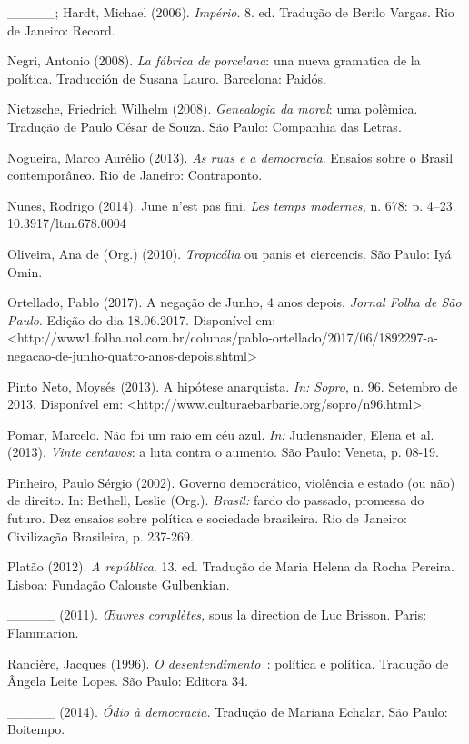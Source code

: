 \_\_\_\_\_; Hardt, Michael (2006). \emph{Império}. 8. ed. Tradução de
Berilo Vargas. Rio de Janeiro: Record.

Negri, Antonio (2008). \emph{La fábrica de porcelana}: una nueva
gramatica de la política. Traducción de Susana Lauro. Barcelona: Paidós.

Nietzsche, Friedrich Wilhelm (2008). \emph{Genealogia da moral}: uma
polêmica. Tradução de Paulo César de Souza. São Paulo: Companhia das
Letras.

Nogueira, Marco Aurélio (2013). \emph{As ruas e a democracia}. Ensaios
sobre o Brasil contemporâneo. Rio de Janeiro: Contraponto.

Nunes, Rodrigo (2014). June n'est pas fini. \emph{Les temps modernes,}
n. 678: p. 4--23. 10.3917/ltm.678.0004

Oliveira, Ana de (Org.) (2010). \emph{Tropicália }ou panis et
ciercencis. São Paulo: Iyá Omin.

Ortellado, Pablo (2017). A negação de Junho, 4 anos depois. \emph{Jornal
Folha de São Paulo}. Edição do dia 18.06.2017. Disponível em:
\textless{}http://www1.folha.uol.com.br/colunas/pablo-ortellado/2017/06/1892297-a-negacao-de-junho-quatro-anos-depois.shtml\textgreater{}

Pinto Neto, Moysés (2013). A hipótese anarquista. \emph{In: Sopro}, n.
96. Setembro de 2013. Disponível em:
\textless{}http://www.culturaebarbarie.org/sopro/n96.html\textgreater{}.

Pomar, Marcelo. Não foi um raio em céu azul. \emph{In: }Judensnaider,
Elena et al. (2013). \emph{Vinte centavos}: a luta contra o aumento. São
Paulo: Veneta, p. 08-19.

Pinheiro, Paulo Sérgio (2002). Governo democrático, violência e estado
(ou não) de direito. In: Bethell, Leslie (Org.). \emph{Brasil:} fardo do
passado, promessa do futuro. Dez ensaios sobre política e sociedade
brasileira. Rio de Janeiro: Civilização Brasileira, p. 237-269.

Platão (2012). \emph{A república}. 13. ed. Tradução de Maria Helena da
Rocha Pereira. Lisboa: Fundação Calouste Gulbenkian.

\_\_\_\_\_ (2011). \emph{Œuvres complètes, }sous la direction de Luc
Brisson. Paris: Flammarion.

Rancière, Jacques (1996). \emph{O desentendimento~}: política e
política. Tradução de Ângela Leite Lopes. São Paulo: Editora 34.

\_\_\_\_\_ (2014). \emph{Ódio à democracia. }Tradução de Mariana
Echalar. São Paulo: Boitempo.

